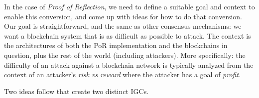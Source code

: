 In the case of \emph{Proof of Reflection}, we need to define a suitable
goal and context to enable this conversion, and come up with ideas for
how to do that conversion. Our goal is straightforward, and the same as
other consensus mechanisms: we want a blockchain system that is as
difficult as possible to attack. The context is the architectures of
both the PoR implementation and the blockchains in question, plus the
rest of the world (including attackers). More specifically: the
difficulty of an attack against a blockchain network is typically
analyzed from the context of an attacker's \emph{risk vs reward} where
the attacker has a goal of \emph{profit}.

Two ideas follow that create two distinct IGCs.
